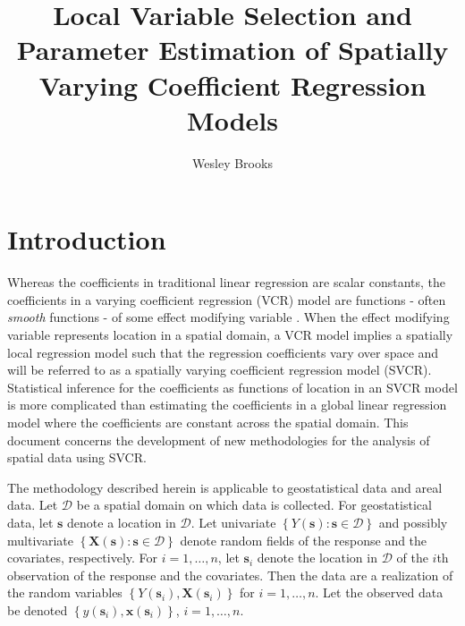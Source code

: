 \documentclass[authoryear, review, 11pt]{elsarticle}
\title{Local Variable Selection and Parameter Estimation of Spatially Varying Coefficient Regression Models}
\author{Wesley Brooks}
\date{}                                           %
\begin{document}
\maketitle


\section{Introduction}
	Whereas the coefficients in traditional linear regression are scalar constants, the coefficients in a varying coefficient regression (VCR) model are functions - often \emph{smooth} functions - of some effect modifying variable \citep{Hastie:1993a}. When the effect modifying variable represents location in a spatial domain, a VCR model implies a spatially local regression model such that the regression coefficients vary over space and will be referred to as a spatially varying coefficient regression model (SVCR). Statistical inference for the coefficients as functions of location in an SVCR model is more complicated than estimating the coefficients in a global linear regression model where the coefficients are constant across the spatial domain. This document concerns the development of new methodologies for the analysis of spatial data using SVCR.
	
	The methodology described herein is applicable to geostatistical data and areal data. Let $\mathcal{D}$ be a spatial domain on which data is collected. For geostatistical data, let $\bm{s}$ denote a location in $\mathcal{D}$. Let univariate $\left\{Y(\bm{s}) : \bm{s} \in \mathcal{D}\right\}$ and possibly multivariate $\left\{\bm{X}(\bm{s}) : \bm{s} \in \mathcal{D}\right\}$ denote random fields of the response and the covariates, respectively. For $i = 1, \dots, n$, let $\bm{s}_i$ denote the location in $\mathcal{D}$ of the $i$th observation of the response and the covariates. Then the data are a realization of the random variables $\left\{Y(\bm{s}_i), \bm{X}(\bm{s}_i)\right\}$ for $i=1, \dots, n$. Let the observed data be denoted $\left\{y(\bm{s}_i), \bm{x}(\bm{s}_i)\right\}$, $i=1, \dots, n$.
	
\end{document}

